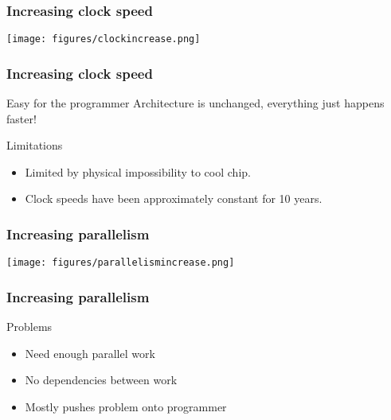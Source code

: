 \documentclass[dvipsnames,presentation,aspectratio=169,14pt]{beamer}
\begin{document}
\begin{frame}
  \frametitle{Increasing clock speed}
  \begin{center}
    \texttt{[image: figures/clockincrease.png]}
  \end{center}
\end{frame}

\begin{frame}
  \frametitle{Increasing clock speed}
    \begin{answer}{Easy for the programmer}
      Architecture is unchanged, everything just happens faster!
    \end{answer}
    \begin{challenge}{Limitations}
      \begin{itemize}[itemsep=5pt]
      \item Limited by physical impossibility to cool chip.
      \item Clock speeds have been approximately constant for 10 years.
      \end{itemize}
    \end{challenge}
\end{frame}

\begin{frame}
  \frametitle{Increasing parallelism}
  \begin{center}
    \texttt{[image: figures/parallelismincrease.png]}
  \end{center}
\end{frame}

\begin{frame}
  \frametitle{Increasing parallelism}
  \begin{challenge}{Problems}
    \begin{itemize}[itemsep=7pt]
    \item Need enough parallel work

    \item No dependencies between work

    \item Mostly pushes problem onto programmer
    \end{itemize}
  \end{challenge}
\end{frame}
\end{document}
